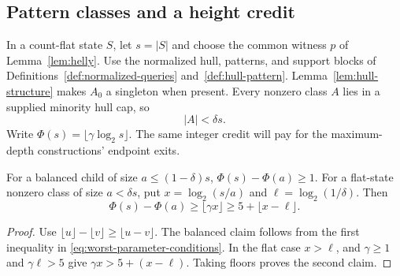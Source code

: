 \subsection{Pattern classes and a height credit}

In a count-flat state $S$, let $s=|S|$ and choose the common witness
$p$ of Lemma~\ref{lem:helly}. Use the normalized hull, patterns,
and support blocks of Definitions~\ref{def:normalized-queries}
and~\ref{def:hull-pattern}.
Lemma~\ref{lem:hull-structure} makes $A_0$ a singleton when present.
Every nonzero class $A$ lies in a supplied minority hull cap, so
\[
 |A|<\delta s.
\]
Write $\Phi(s)=\lfloor\gamma\log_2s\rfloor$. The same integer
credit will pay for the maximum-depth constructions' endpoint exits.
\begin{lemma}\label{lem:worst-floor-credit}
For a balanced child of size $a\le(1-\delta)s$,
$\Phi(s)-\Phi(a)\ge1$. For a flat-state nonzero class of size
$a<\delta s$, put $x=\log_2(s/a)$ and
$\ell=\log_2(1/\delta)$. Then
\begin{equation}\label{eq:worst-floor-credit}
 \Phi(s)-\Phi(a)\ge\lfloor\gamma x\rfloor
 \ge5+\lfloor x-\ell\rfloor.
\end{equation}
\end{lemma}
\begin{proof}
Use $\lfloor u\rfloor-\lfloor v\rfloor\ge\lfloor u-v\rfloor$.
The balanced claim follows from the first inequality in
\eqref{eq:worst-parameter-conditions}. In the flat case $x>\ell$,
and $\gamma\ge1$ and $\gamma\ell>5$ give
$\gamma x>5+(x-\ell)$. Taking floors proves the second claim.
\end{proof}

